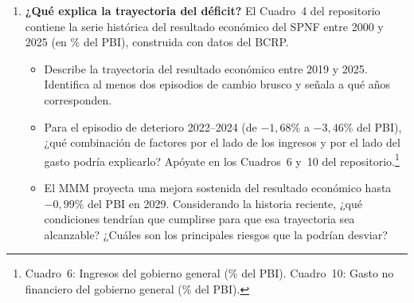 \begin{enumerate}[label = (\alph*), start=3]
            \begin{itemize}
                \item ¿Por qué ambos indicadores difieren?
                      ¿Qué componentes de los ingresos y del PBI
                      se ``corrigen'' al pasar del resultado convencional
                      al estructural?
                \item El resultado estructural es \emph{más negativo}
                      que el convencional en 2024 y 2025, pero ambos
                      convergen hacia 2029.
                      ¿Qué te dice eso sobre la posición cíclica de la
                      economía peruana en esos años y sobre la
                      sostenibilidad de la consolidación fiscal proyectada?
            \end{itemize}

            \item \textbf{¿Qué explica la trayectoria del déficit?}
            El Cuadro~4 del repositorio contiene la serie histórica del
            resultado económico del SPNF entre 2000 y 2025 (en \%
            del PBI), construida con datos del BCRP.

            \begin{itemize}
                \item Describe la trayectoria del resultado económico
                      entre 2019 y 2025. Identifica al menos dos
                      episodios de cambio brusco y señala a qué años
                      corresponden.
                \item Para el episodio de deterioro 2022--2024
                      (de $-1{,}68\%$ a $-3{,}46\%$ del PBI),
                      ¿qué combinación de factores por el lado de los
                      ingresos y por el lado del gasto podría explicarlo?
                      Apóyate en los Cuadros~6 y~10 del repositorio.\footnote{Cuadro~6:
                      Ingresos del gobierno general (\% del PBI).
                      Cuadro~10: Gasto no financiero del gobierno
                      general (\% del PBI).}
                \item El MMM proyecta una mejora sostenida del resultado
                      económico hasta $-0{,}99\%$ del PBI en 2029.
                      Considerando la historia reciente, ¿qué condiciones
                      tendrían que cumplirse para que esa trayectoria
                      sea alcanzable?
                      ¿Cuáles son los principales riesgos que la
                      podrían desviar?
            \end{itemize}

        \end{enumerate}
